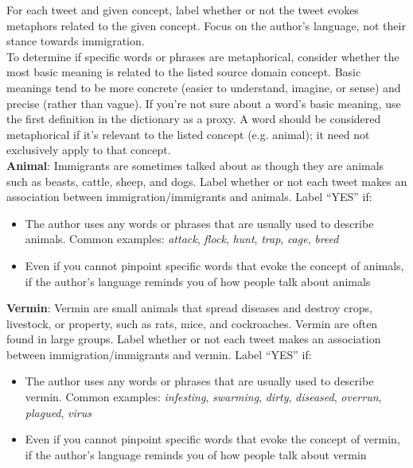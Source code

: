 \begin{table*}[htbp!]
\begin{tcolorbox}[colback=white, colframe=white!30!black, boxrule=1pt, arc=4mm, width=\textwidth, boxrule=1pt,title=Codebook,fontupper=\footnotesize]

For each tweet and given concept, label whether or not the tweet evokes metaphors related to the given concept. Focus on the author's language, not their stance towards immigration.\\

To determine if specific words or phrases are metaphorical, consider whether the most basic meaning is related to the listed source domain concept. Basic meanings tend to be more concrete (easier to understand, imagine, or sense) and precise (rather than vague). If you’re not sure about a word’s basic meaning, use the first definition in the dictionary as a proxy. A word should be considered metaphorical if it’s relevant to the listed concept (e.g. animal); it need not exclusively apply to that concept. \\

\textbf{Animal}: Immigrants are sometimes talked about as though they are animals such as beasts, cattle, sheep, and dogs. Label whether or not each tweet makes an association between immigration/immigrants and animals. Label ``YES'' if:
\begin{itemize}[noitemsep, topsep=0pt]
    \item The author uses any words or phrases that are usually used to describe animals. Common examples: \textit{attack}, \textit{flock}, \textit{hunt}, \textit{trap}, \textit{cage}, \textit{breed}
    \item Even if you cannot pinpoint specific words that evoke the concept of animals, if the author's language reminds you of how people talk about animals
\end{itemize}

\textbf{Vermin}: Vermin are small animals that spread diseases and destroy crops, livestock, or property, such as rats, mice, and cockroaches. Vermin are often found in large groups. Label whether or not each tweet makes an association between immigration/immigrants and vermin. Label ``YES'' if:
\begin{itemize}[noitemsep, topsep=0pt]
    \item The author uses any words or phrases that are usually used to describe vermin. Common examples: \textit{infesting}, \textit{swarming}, \textit{dirty}, \textit{diseased}, \textit{overrun}, \textit{plagued}, \textit{virus}
    \item Even if you cannot pinpoint specific words that evoke the concept of vermin, if the author's language reminds you of how people talk about vermin
\end{itemize}



\end{tcolorbox}
\end{table*}
